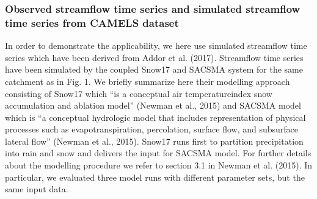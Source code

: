 \documentclass[letterpaper,10pt,english]{sphinxmanual}
\begin{document}
\subsubsection{Observed streamflow time series and simulated streamflow time series from CAMELS dataset}
\label{\detokenize{tutorials/02_real_case_application:Observed-streamflow-time-series-and-simulated-streamflow-time-series-from-CAMELS-dataset}}
In order to demonstrate the applicability, we here use simulated streamflow time series which have been derived from Addor et al. (2017). Streamflow time series have been simulated by the coupled Snow\sphinxhyphen{}17 and SAC\sphinxhyphen{}SMA system for the same catchment as in Fig. 1. We briefly summarize here their modelling approach consisting of Snow\sphinxhyphen{}17 which “is a conceptual air\sphinxhyphen{} temperature\sphinxhyphen{}index snow accumulation and ablation model” (Newman et al., 2015) and SAC\sphinxhyphen{}SMA model which is “a conceptual hydrologic model
that includes representation of physical processes such as evapotranspiration, percolation, surface flow, and subsurface lateral flow” (Newman et al., 2015). Snow\sphinxhyphen{}17 runs first to partition precipitation into rain and snow and delivers the input for SAC\sphinxhyphen{}SMA model. For further details about the modelling procedure we refer to section 3.1 in Newman et al. (2015). In particular, we evaluated three model runs with different parameter sets, but the same input data.

{
\begin{sphinxVerbatim}[commandchars=\\\{\}]
\llap{\color{nbsphinxin}[4]:\,\hspace{\fboxrule}\hspace{\fboxsep}}   
   
   
  
  
  
\end{sphinxVerbatim}
}
\end{document}
